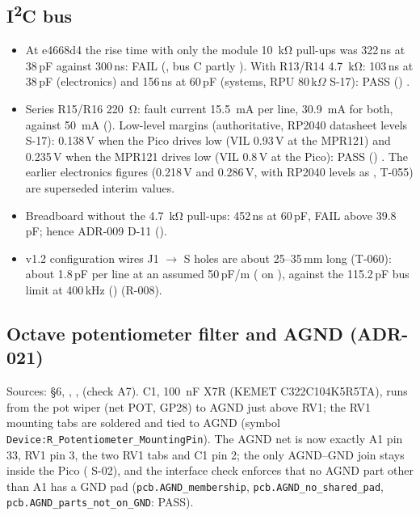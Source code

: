 \subsection{\texorpdfstring{I\textsuperscript{2}C bus}{I2C bus}}
\begin{itemize}[noitemsep]
  \item At e4668d4 the rise time with only the module \qty{10}{\kilo\ohm}
        pull-ups was 322\,ns at 38\,pF against 300\,ns: FAIL (,
        bus C partly ). With R13/R14 \qty{4.7}{\kilo\ohm}: 103\,ns
        at 38\,pF (electronics) and 156\,ns at 60\,pF (systems, RPU 80\,k$\Omega$
         S-17): PASS () .
  \item Series R15/R16 \qty{220}{\ohm}: fault current \qty{15.5}{\milli\ampere}
        per line, \qty{30.9}{\milli\ampere} for both, against \qty{50}{\milli\ampere}
        (). Low-level margins (authoritative, RP2040 datasheet levels
         S-17): 0.138\,V when the Pico drives low (VIL 0.93\,V at the
        MPR121) and 0.235\,V when the MPR121 drives low (VIL 0.8\,V at the Pico):
        PASS () . The earlier
        electronics figures (0.218\,V and 0.286\,V, with RP2040 levels as
        , T-055) are superseded interim values.
  \item Breadboard without the \qty{4.7}{\kilo\ohm} pull-ups: 452\,ns at 60\,pF,
        FAIL above 39.8\,pF; hence ADR-009 D-11 ().
  \item v1.2 configuration wires J1 $\rightarrow$ S holes are about 25--35\,mm long
        (T-060): about 1.8\,pF per line at an assumed 50\,pF/m ( on
        ), against the 115.2\,pF bus limit at 400\,kHz
        ()  (R-008).
\end{itemize}

\subsection{Octave potentiometer filter and AGND (ADR-021)}
\label{sec:pot-filter}
Sources:  \S6,
,
,  (check A7).
C1, \qty{100}{\nano\farad} X7R (KEMET C322C104K5R5TA), runs from the pot wiper (net
POT, GP28) to AGND just above RV1; the RV1 mounting tabs are soldered and tied to AGND
(symbol \texttt{Device:R\_Potentiometer\_MountingPin}). The AGND net is now exactly
A1 pin 33, RV1 pin 3, the two RV1 tabs and C1 pin 2; the only AGND--GND join stays
inside the Pico ( S-02), and the interface check enforces that no AGND
part other than A1 has a GND pad (\nolinkurl{pcb.AGND_membership},
\nolinkurl{pcb.AGND_no_shared_pad}, \nolinkurl{pcb.AGND_parts_not_on_GND}: PASS).

